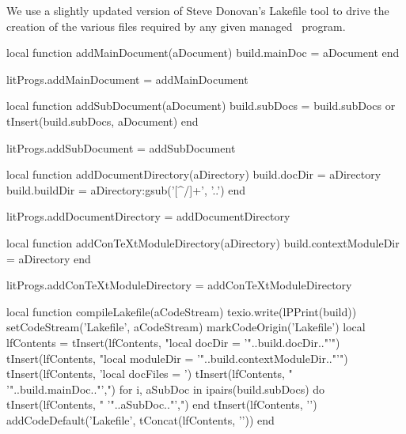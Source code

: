 
\startchapter[title=Lakefile]

We use a slightly updated version of Steve Donovan's Lakefile tool to 
drive the creation of the various files required by any given 
 managed \ConTeXt\ program. 

\startMkIVCode
\def\addMainDocument#1{
  \directlua{
    thirddata.literateProgs.addMainDocument('#1')
  }
}

\def\addSubDocument#1{
  \directlua{
    thirddata.literateProgs.addSubDocument('#1')
  }
}

\def\addDocumentDirectory#1{
  \directlua{
    thirddata.literateProgs.addDocumentDirectory('#1')
  }
}

\def\addConTeXtModuleDirectory#1{
  \directlua{
    thirddata.literateProgs.addConTeXtModuleDirectory('#1')
  }
}
\stopMkIVCode

\startLuaCode
local function addMainDocument(aDocument)
  build.mainDoc = aDocument
end

litProgs.addMainDocument = addMainDocument

local function addSubDocument(aDocument)
  build.subDocs = build.subDocs or { }
  tInsert(build.subDocs, aDocument)
end

litProgs.addSubDocument = addSubDocument

local function addDocumentDirectory(aDirectory)
  build.docDir   = aDirectory
  build.buildDir = aDirectory:gsub('[^/]+', '..')
end

litProgs.addDocumentDirectory = addDocumentDirectory

local function addConTeXtModuleDirectory(aDirectory)
  build.contextModuleDir = aDirectory
end

litProgs.addConTeXtModuleDirectory = addConTeXtModuleDirectory
\stopLuaCode

\startMkIVCode
\def\compileLakefile#1{
  \directlua{
    thirddata.literateProgs.compileLakefile('#1')
  }
}
\stopMkIVCode

\startLuaCode
local function compileLakefile(aCodeStream)
  texio.write(lPPrint(build))
  setCodeStream('Lakefile', aCodeStream)
  markCodeOrigin('Lakefile')
  local lfContents = {}
  tInsert(lfContents, "local docDir = '"..build.docDir.."'")
  tInsert(lfContents, "local moduleDir = '"..build.contextModuleDir.."'")
  tInsert(lfContents, 'local docFiles = {')
  tInsert(lfContents, "  '"..build.mainDoc.."',")
  for i, aSubDoc in ipairs(build.subDocs) do
    tInsert(lfContents, "  '"..aSubDoc.."',")
  end
  tInsert(lfContents, '}')
  addCodeDefault('Lakefile', tConcat(lfContents, '\n'))
end

